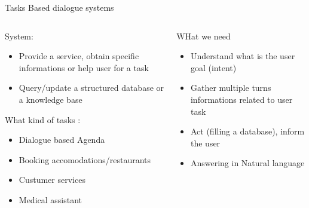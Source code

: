 \documentclass[10pt,aspectratio=169]{beamer}
\begin{document}
\begin{frame}{Tasks Based dialogue systems}
    \begin{columns}
        \begin{column}{0.5\textwidth}
            \begin{block}{System: }
                \begin{itemize}
                    \item Provide a service, obtain specific informations or help user for a task
                    \item Query/update a structured database or a knowledge base
                \end{itemize}
            \end{block}
            \begin{block}{What kind of tasks : }
                \begin{itemize}
                    \item Dialogue based Agenda
                    \item Booking accomodations/restaurants
                    \item Custumer services
                    \item Medical assistant
                \end{itemize}
            \end{block}
        \end{column}
        \begin{column}{0.5\textwidth}
            \begin{block}{WHat we need}
                \begin{itemize}
                    \item Understand what is the user goal (intent)
                    \item Gather multiple turns informations related to user task
                    \item Act (filling a database), inform the user
                    \item Answering in Natural language
                \end{itemize}
            \end{block}
        \end{column}
    \end{columns}
\end{frame}
\end{document}
